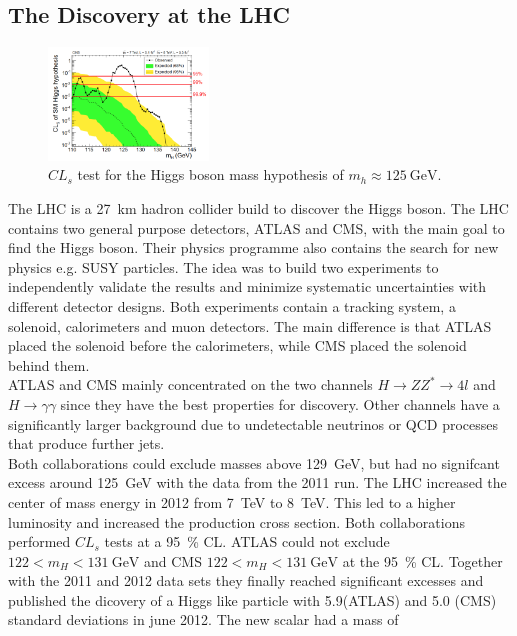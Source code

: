 \subsection{The Discovery at the LHC}
\begin{figure}
    \includegraphics[width=0.38\textwidth]{graphics/higgs.png}
    \caption{$CL_s$ test for the Higgs boson mass hypothesis of $m_h\approx\SI{125}{\GeV}$. \cite{higgs}}
  \end{figure}
  \FloatBarrier
The LHC is a \SI{27}{\kilo\meter} hadron collider build to discover the Higgs boson. The LHC contains two general purpose detectors, ATLAS and CMS, with the main goal to find the Higgs boson. Their physics programme also contains the search for new physics e.g. SUSY particles. The idea was to build two experiments to independently validate the results and minimize systematic uncertainties with different detector designs. Both experiments contain a tracking system, a solenoid, calorimeters and muon detectors. The main difference is that ATLAS placed the solenoid before the calorimeters, while CMS placed the solenoid behind them.\\
ATLAS and CMS mainly concentrated on the two channels $H\rightarrow ZZ^* \rightarrow 4l$ and $H\rightarrow \gamma\gamma$ since they have the best properties for discovery. Other channels have a significantly larger background due to undetectable neutrinos or QCD processes that produce further jets.\\
Both collaborations could exclude masses above \SI{129}{\GeV}, but had no signifcant excess around \SI{125}{\GeV} with the data from the 2011 run. The LHC increased the center of mass energy in 2012 from \SI{7}{\TeV} to \SI{8}{\TeV}. This led to a higher luminosity and increased the production cross section. Both collaborations performed $CL_s$ tests at a \SI{95}{\percent} CL. ATLAS could not exclude $122<m_H<\SI{131}{\GeV}$ and CMS $122<m_H<\SI{131}{\GeV}$ at the \SI{95}{\percent} CL. Together with the 2011 and 2012 data sets they finally reached significant excesses and published the dicovery of a Higgs like particle with 5.9(ATLAS) and 5.0 (CMS) standard deviations in june 2012. The new scalar had a mass of
